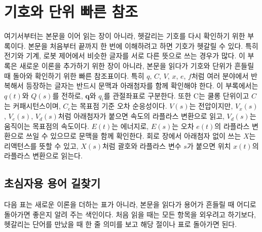 \section{기호와 단위 빠른 참조}
\label{sec:notation-checklist}

여기서부터는 본문을 이어 읽는 장이 아니라, 헷갈리는 기호를 다시 확인하기 위한 부록이다.
본문을 처음부터 끝까지 한 번에 이해하려고 하면 기호가 헷갈릴 수 있다.
특히 전기와 기계, 로봇 제어에서 비슷한 글자를 서로 다른 뜻으로 쓰는 경우가 많다.
이 부록은 새로운 이론을 추가하기 위한 장이 아니라, 본문을 읽다가 기호와 단위가 흔들릴 때 돌아와 확인하기 위한 빠른 참조표이다.
특히 $q$, $C$, $V$, $x$, $e$, $f$처럼 여러 분야에서 반복해서 등장하는 글자는 반드시 문맥과 아래첨자를 함께 확인해야 한다.
이 부록에서는 $q(t)$와 $Q(s)$를 전하로, $\bm{q}$와 $q_i$를 관절좌표로 구분한다.
또한 $\mathrm{C}$는 쿨롱 단위이고 $C$는 커패시턴스이며, $C_e$는 목표점 기준 오차 순응성이다.
$V(s)$는 전압이지만, $V_x(s)$, $V_e(s)$, $V_d(s)$처럼 아래첨자가 붙으면 속도의 라플라스 변환으로 읽고, $V_d(s)$는 움직이는 목표점의 속도이다.
%
$E(t)$는 에너지로, $E(s)$는 오차 $e(t)$의 라플라스 변환으로 쓰일 수 있으므로 문맥을 함께 확인한다.
회로 장에서 아래첨자 없이 쓰는 $X$는 리액턴스를 뜻할 수 있고, $X(s)$처럼 괄호와 라플라스 변수 $s$가 붙으면 위치 $x(t)$의 라플라스 변환으로 읽는다.

\subsection{초심자용 용어 길찾기}
\label{sec:beginner-glossary-roadmap}

다음 표는 새로운 이론을 더하는 표가 아니라, 본문을 읽다가 용어가 흔들릴 때 어디로 돌아가면 좋은지 알려 주는 색인이다.
처음 읽을 때는 모든 항목을 외우려고 하기보다, 헷갈리는 단어를 만났을 때 한 줄 의미를 보고 해당 절이나 표로 돌아가면 된다.

